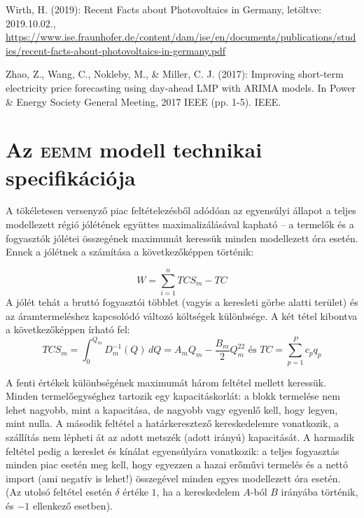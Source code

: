 \documentclass[twoside, magyar, showtrims]{corvinusphd}
\theoremstyle{plain}
\theoremstyle{remark}
\theoremstyle{definition}
\begin{document}
\begin{thebibliography}{99}
Wirth, H. (2019): Recent Facts about Photovoltaics in Germany, letöltve: 2019.10.02.,
\url{https://www.ise.fraunhofer.de/content/dam/ise/en/documents/publications/studies/recent-facts-about-photovoltaics-in-germany.pdf}

Zhao, Z., Wang, C., Nokleby, M., \& Miller, C. J. (2017): Improving short-term electricity price forecasting using day-ahead LMP with ARIMA models. In Power \& Energy Society General Meeting, 2017 IEEE (pp. 1-5). IEEE.
\end{thebibliography}

\backmatter
\renewcommand{\appendixpagename}{Függelékek}
\renewcommand{\appendixtocname}{\appendixpagename}
\appendix
\appendixpage
\renewcommand{\chaptername}{\appendixname}
\chapter{Az \textsc{eemm} modell technikai specifikációja}\label{app:1}

\scwords A tökéletesen versenyző piac feltételezésből adódóan az egyensúlyi állapot a teljes modellezett
régió jólétének együttes maximalizálásával kapható – a termelők és a fogyasztók jólétei összegének
maximumát keressük minden modellezett óra esetén.
Ennek a jólétnek a számítása a következőképpen történik:

\[
    W=
    \sum_{i=1}^nTCS_m-TC
\]
A jólét tehát a bruttó fogyasztói többlet (vagyis a keresleti görbe alatti terület) és az áramtermeléshez
kapcsolódó változó költségek különbsége.
A két tétel kibontva a következőképpen írható fel:
\[
    TCS_m=
    \int_0^{Q_m}D_m^{-1}(Q)\,dQ=A_mQ_m-\frac{B_m}{2}Q_m^22\mbox{ és }
    TC=\sum_{p=1}^Pc_pq_p
\]

A fenti értékek különbségének maximumát három feltétel mellett keressük.
Minden termelőegységhez
tartozik egy kapacitáskorlát: a blokk termelése nem lehet nagyobb,
mint a kapacitása,
de nagyobb
vagy egyenlő kell, hogy legyen, mint nulla.
A második feltétel a határkeresztező kereskedelemre vonatkozik,
a szállítás nem lépheti át az adott metszék (adott irányú) kapacitását.
A harmadik feltétel pedig
a kereslet és kínálat egyensúlyára vonatkozik: a teljes fogyasztás minden piac esetén meg kell,
hogy egyezzen a hazai erőművi termelés és a nettó import (ami negatív is lehet!) összegével
minden egyes modellezett óra esetén.
(Az utolsó feltétel esetén $\delta$ értéke $1$, ha a kereskedelem $A$-ból $B$ irányába történik,
és $-1$ ellenkező esetben).
\end{document}
